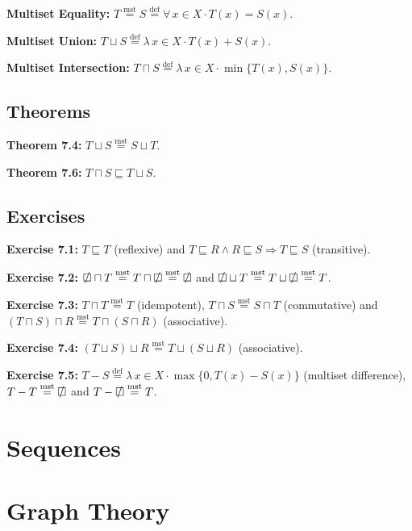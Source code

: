 \documentclass[12pt]{article}
\newcommand{\defeq}{\stackrel{\text{def}}{=}}
\newcommand{\msteq}{\stackrel{\text{mst}}{=}}
\newcommand{\sqemptyset}{\ensurestackMath{\stackinset{c}{}{c}{}{/}{\square}}}
\theoremstyle{plain}
\begin{document}
\textbf{Multiset Equality:} $T \msteq S \defeq \forall\, x \in X
\cdot T(x) = S(x)$.

\textbf{Multiset Union:} $T \sqcup S \defeq \lambda\, x \in X
\cdot T(x) + S(x)$.

\textbf{Multiset Intersection:} $T \sqcap S \defeq \lambda\, x
\in X \cdot \operatorname{min}\{T(x), S(x)\}$.

\subsection{Theorems}

\textbf{Theorem 7.4:} $T \sqcup S \msteq S \sqcup T$.

\textbf{Theorem 7.6:} $T \sqcap S \sqsubseteq T \sqcup S$.

\subsection{Exercises}

\textbf{Exercise 7.1:} $T \sqsubseteq T$ (reflexive) and $T
\sqsubseteq R \land R \sqsubseteq S \Rightarrow T \sqsubseteq S$
(transitive).

\textbf{Exercise 7.2:} $\sqemptyset \sqcap T \msteq T \sqcap
\sqemptyset \msteq \sqemptyset$ and $\sqemptyset \sqcup T \msteq
T \sqcup \sqemptyset \msteq T$.

\textbf{Exercise 7.3:} $T \sqcap T \msteq T$ (idempotent), $T
\sqcap S \msteq S \sqcap T$ (commutative) and $(T \sqcap S)
\sqcap R \msteq T \sqcap (S \sqcap R)$ (associative).

\textbf{Exercise 7.4:} $(T \sqcup S)
\sqcup R \msteq T \sqcup (S \sqcup R)$ (associative).

\textbf{Exercise 7.5:} $T - S \defeq \lambda\, x \in X \cdot
\operatorname{max}\{0, T(x) - S(x)\}$ (multiset difference), $T
- T \msteq \sqemptyset$ and $T - \sqemptyset \msteq T$.

\section{Sequences}

\section{Graph Theory}
\end{document}
